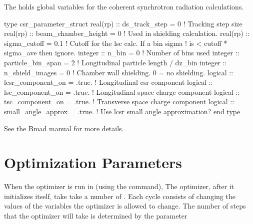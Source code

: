 {The  holds global variables for the coherent
synchrotron radiation calculations. 
\begin{example}
  type csr_parameter_struct
    real(rp) :: ds_track_step = 0          ! Tracking step size
    real(rp) :: beam_chamber_height = 0    ! Used in shielding calculation.
    real(rp) :: sigma_cutoff = 0.1         ! Cutoff for the lsc calc. If a bin sigma
                                           !  is < cutoff * sigma_ave then ignore.
    integer :: n_bin = 0                   ! Number of bins used
    integer :: particle_bin_span = 2       ! Longitudinal particle length / dz_bin
    integer :: n_shield_images = 0         ! Chamber wall shielding. 0 = no shielding.
    logical :: lcsr_component_on = .true.  ! Longitudinal csr component
    logical :: lsc_component_on = .true.   ! Longitudinal space charge component
    logical :: tsc_component_on = .true.   ! Transverse space charge component
    logical :: small_angle_approx = .true. ! Use lcsr small angle approximation?
  end type
\end{example}
See the Bmad manual for more details.

\section{Optimization Parameters}
\label{s:opt_params}

When the optimizer is run in \tao (using the  command), The
optimizer, after it initializes itself, take take a number of
. Each cycle consists of changing the values of the
variables the optimizer is allowed to change. The number of steps that
the optimizer will take is determined by the parameter
\vn{global%
goes through \vn{global%
through one \vn{loop}. The optimizer, after going through through
\vn{global%
To immediately stop the optimizer the period key
\vn{``.''} may be pressed.

\section{Initializing Coupled Universes}\index{Initialization!Coupling}
\label{s:coupled_uni}

}}}}
